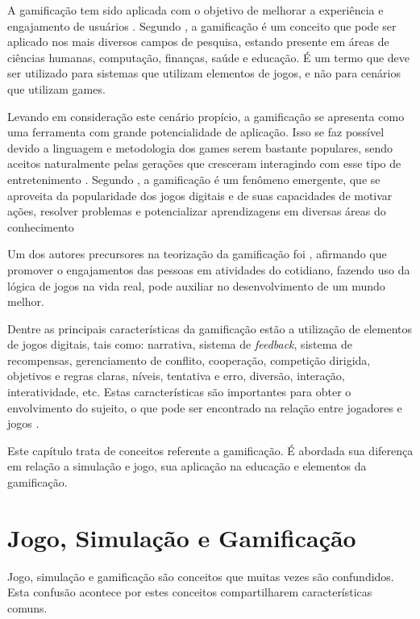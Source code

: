 \documentclass[
	12pt,				%
	oneside,			%
	a4paper,			%
	english,			%
	french,				%
	spanish,			%
	brazil,				%
	]{abntex2}
\begin{document}
A gamificação tem sido aplicada com o objetivo de melhorar a experiência e engajamento de usuários \cite{quadros2016gamificaccao}. Segundo \citet{deterding2011game}, a gamificação é um conceito que pode ser aplicado nos mais diversos campos de pesquisa, estando presente em áreas de ciências humanas, computação, finanças, saúde e educação. É um termo que deve ser utilizado para sistemas que utilizam elementos de jogos, e não para cenários que utilizam games. 

Levando em consideração este cenário propício, a gamificação se apresenta como uma ferramenta com grande potencialidade de aplicação. Isso se faz possível devido a linguagem e metodologia dos games serem bastante populares, sendo aceitos naturalmente pelas gerações que cresceram interagindo com esse tipo de entretenimento \cite{fardo2013gamificaccao}. Segundo \citet{deterding2011game}, a gamificação é um fenômeno emergente, que se aproveita da popularidade dos jogos digitais e de suas capacidades de motivar ações, resolver problemas e potencializar aprendizagens em diversas áreas do conhecimento

Um dos autores precursores na teorização da gamificação foi \citet{mcgonigal2011reality}, afirmando que promover o engajamentos das pessoas em atividades do cotidiano, fazendo uso da lógica de jogos na vida real, pode auxiliar no desenvolvimento de um mundo melhor.

Dentre as principais características da gamificação estão a utilização de elementos de jogos digitais, tais como: narrativa, sistema de \textit{feedback}, sistema de recompensas, gerenciamento de conflito, cooperação, competição dirigida, objetivos e regras claras, níveis, tentativa e erro, diversão, interação, interatividade, etc. Estas características são importantes para obter o envolvimento do sujeito, o que pode ser encontrado na relação entre jogadores e jogos \cite{deterding2011game}.

Este capítulo trata de conceitos referente a gamificação. É abordada sua diferença em relação a simulação e jogo, sua aplicação na educação e elementos da gamificação.

\section{Jogo, Simulação e Gamificação}

Jogo, simulação e gamificação são conceitos que muitas vezes são confundidos. Esta confusão acontece por estes conceitos compartilharem características comuns.
\end{document}
